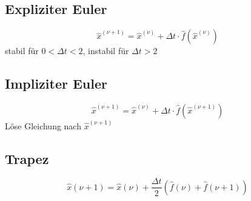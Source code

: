 \documentclass[german]{latex4ei/latex4ei_sheet}
\begin{document}
\begin{sectionbox}
\subsection{Expliziter Euler}
\begin{equation*}
	\hat{x}^{(\nu + 1)} = \hat{x}^{(\nu)} + \Delta t \cdot \hat{f}\left(\hat{x}^{(\nu)}\right)
\end{equation*}
stabil für $0 < Δt < 2$, instabil für $Δt > 2$
\subsection{Impliziter Euler}
\begin{equation*}
	\hat{x}^{(\nu + 1)} = \hat{x}^{(\nu)} + \Delta t \cdot \hat{f}\left(\hat{x}^{(\nu + 1)}\right)
\end{equation*}
Löse Gleichung nach $\hat{x}^{(\nu + 1)} $

\subsection{Trapez}
\begin{equation*}
	\hat{x}(\nu + 1) = \hat{x}(\nu) + \frac{\Delta t}{2} (\hat{f}(\nu) + \hat{f}(\nu + 1))
\end{equation*}
\end{sectionbox}
\end{document}

